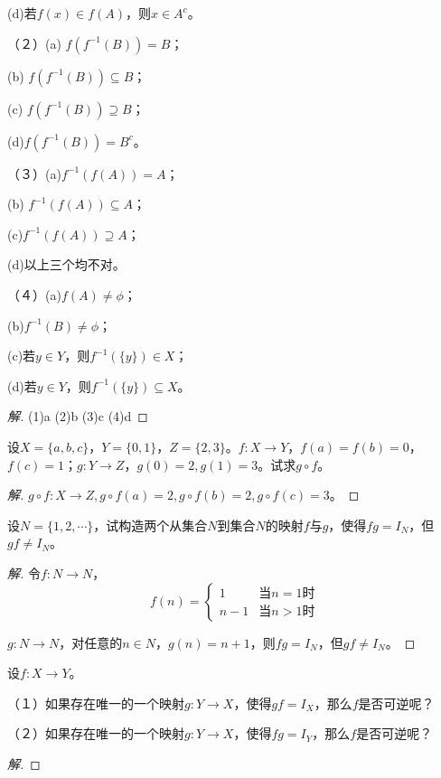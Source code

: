 \documentclass{article}
\begin{document}
\begin{CJK}{UTF8}{gbsn}
\begin{Exercise}
  (d)若$f(x)\in f(A)$，则$x\in A^c$。

  （２）(a) $f(f^{-1}(B))=B$；

  (b) $f(f^{-1}(B))\subseteq B$；

  (c) $f(f^{-1}(B))\supseteq B$；

  (d)$f(f^{-1}(B))= B^c$。

  （３）(a)$f^{-1}(f(A))=A$；

  (b) $f^{-1}(f(A))\subseteq A$；

  (c)$f^{-1}(f(A))\supseteq A$；

  (d)以上三个均不对。

  （４）(a)$f(A)\neq \phi$；

  (b)$f^{-1}(B) \neq \phi$；

  (c)若$y\in Y$，则$f^{-1}(\{y\})\in X$；

  (d)若$y\in Y$，则$f^{-1}(\{y\})\subseteq X$。
\end{Exercise}
\begin{proof}[解]
  (1)a (2)b (3)c (4)d
\end{proof}
\begin{Exercise}
  设$X=\{a,b,c\}$，$Y=\{0,1\}$，$Z=\{2,3\}$。$f:X\to Y$，$f(a)=f(b)=0$，$f(c)=1$；$g:Y\to Z$，$g(0)=2,g(1)=3$。试求$g\circ f$。
\end{Exercise}
\begin{proof}[解]
  $g\circ f:X\to Z, g\circ f(a)=2, g\circ f(b)=2, g\circ f(c)=3$。
\end{proof}
\begin{Exercise}
  设$N=\{1,2,\cdots\}$，试构造两个从集合$N$到集合$N$的映射$f$与$g$，使得$fg=I_N$，但$gf\neq I_N$。
\end{Exercise}
\begin{proof}[解]
  令$f:N\to N$，
  \[f(n)=
  \begin{cases}
    1& \text{当}n=1\text{时}\\
    n-1&\text{当}n>1\text{时}
  \end{cases}
  \]

  $g:N\to N$，对任意的$n\in N$，$g(n)=n+1$，则$fg=I_N$，但$gf\neq I_N$。
\end{proof}
\begin{Exercise}
设$f:X\to Y$。

（１）如果存在唯一的一个映射$g:Y\to X$，使得$gf=I_X$，那么$f$是否可逆呢？

（２）如果存在唯一的一个映射$g:Y\to X$，使得$fg=I_Y$，那么$f$是否可逆呢？
\end{Exercise}
\begin{proof}[解]


\end{proof}
\end{CJK}
\end{document}
